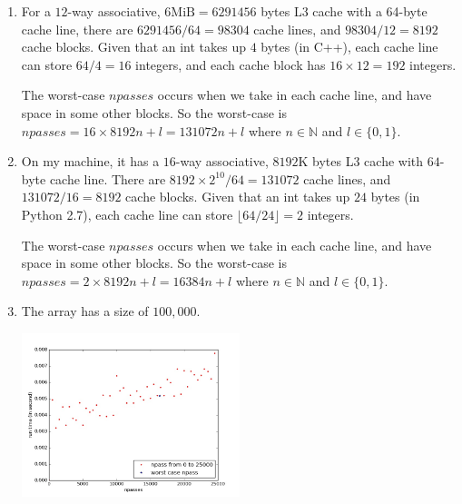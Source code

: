 \documentclass{article}    %
\begin{document}
\begin{enumerate}
	\item For a $12$-way associative, $6\mathrm{MiB} = 6291456$ bytes L3 cache with a 64-byte cache line, there are $6291456/64 = 98304$ cache lines, and $98304/12 = 8192$ cache blocks. Given that an int takes up $4$ bytes (in C++), each cache line can store $64/4 = 16$ integers, and each cache block has $16 \times 12 = 192$ integers. 
	
	The worst-case $npasses$ occurs when we take in each cache line, and have space in some other blocks. So the worst-case is $npasses = 16 \times 8192 n + l = 131072n + l$ where $n \in \mathbb{N}$ and $l \in \{0,1\}$.
	
	\item On my machine, it has a $16$-way associative, $8192$K bytes L3 cache with $64$-byte cache line. There are $8192 \times 2^{10}/64 = 131072$ cache lines, and $131072/16 = 8192$ cache blocks. Given that an int takes up $24$ bytes (in Python 2.7), each cache line can store $\lfloor64/24\rfloor = 2$ integers.
	
	The worst-case $npasses$ occurs when we take in each cache line, and have space in some other blocks. So the worst-case is $npasses = 2 \times 8192 n + l = 16384n + l$ where $n \in \mathbb{N}$ and $l \in \{0,1\}$.
	
	\item The array has a size of $100,000$. \\ 
        \begin{minipage}[t]{\linewidth}
		\centering
		\includegraphics[width=0.5\textwidth]{cache_timing.jpg}
	\end{minipage}
	
\end{enumerate}
\end{document}
